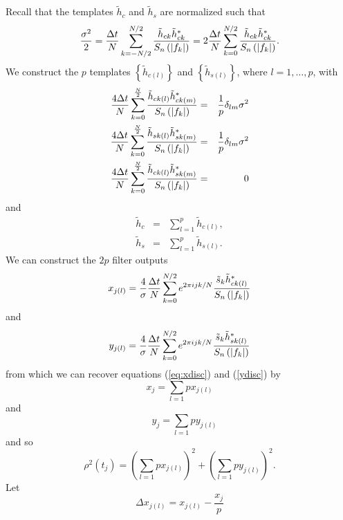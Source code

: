 Recall that the templates $\tilde{h}_c$ and $\tilde{h}_s$ are normalized such
that
\begin{equation}
\frac{\sigma^2}{2} = \frac{\Delta t}{N} \sum_{k=-N/2}^{N/2}
\frac{\tilde{h}_{ck} \tilde{h}_{ck}^\ast } {S_n\left(\left|f_{k}\right|\right)} \nonumber \\
= 2 \frac{\Delta t}{N} \sum_{k=0}^{N/2}
\frac{\tilde{h}_{ck} \tilde{h}_{ck}^\ast } {S_n\left(\left|f_{k}\right|\right)}.
\end{equation}
We construct the $p$ templates $\left\{ \tilde{h}_{c(l)} \right\}$ and 
$\left\{ \tilde{h}_{s(l)} \right\}$, where $l = 1,\ldots,p$, with
\begin{eqnarray}
\frac{4\Delta t}{N} \sum_{k=0}^{\frac{N}{2}} 
\frac{\tilde{h}_{ck(l)} \tilde{h}_{ck(m)}^\ast}{S_n\left(\left|f_{k}\right|\right)} &=& \frac{1}{p}\delta_{lm}\sigma^2 \\
\frac{4\Delta t}{N} \sum_{k=0}^{\frac{N}{2}} 
\frac{\tilde{h}_{sk(l)} \tilde{h}_{sk(m)}^\ast}{S_n\left(\left|f_{k}\right|\right)} &=& \frac{1}{p}\delta_{lm}\sigma^2 \\
\frac{4\Delta t}{N} \sum_{k=0}^{\frac{N}{2}} 
\frac{\tilde{h}_{ck(l)} \tilde{h}_{sk(m)}^\ast}{S_n\left(\left|f_{k}\right|\right)} &=& 0
\end{eqnarray}
and
\begin{eqnarray}
\tilde{h}_{c} &=& \sum_{l=1}^{p} \tilde{h}_{c(l)}, \\
\tilde{h}_{s} &=& \sum_{l=1}^{p} \tilde{h}_{s(l)}.
\end{eqnarray}
We can construct the $2p$ filter outputs
\begin{equation}
x_{j(l)} = \frac{4}{\sigma} \frac{\Delta t}{N} 
   \sum_{k=0}^{N/2} e^{2\pi ijk/N} 
   \frac{\tilde{s}_k \tilde{h}_{ck(l)}^\ast}
        {S_n\left(\left|f_{k}\right|\right)}
\end{equation}
and
\begin{equation}
y_{j(l)} = \frac{4}{\sigma} \frac{\Delta t}{N} 
   \sum_{k=0}^{N/2} e^{2\pi ijk/N} 
   \frac{\tilde{s}_k \tilde{h}_{sk(l)}^\ast}
        {S_n\left(\left|f_{k}\right|\right)}
\end{equation}
from which we can recover equations (\ref{eq:xdisc}) and (\ref{ydisc}) by
\begin{equation}
x_j = \sum_{l = 1}{p} x_{j(l)}
\end{equation}
and
\begin{equation}
\quad y_j = \sum_{l = 1}{p} y_{j(l)}
\end{equation}
and so 
\begin{equation}
\rho^2(t_j) = \left( \sum_{l = 1}{p} x_{j(l)} \right)^2 + \left( \sum_{l = 1}{p} y_{j(l)} \right )^2.
\end{equation}
Let
\begin{equation}
\Delta x_{j(l)} = x_{j(l)} - \frac{x_j}{p}
\end{equation}
